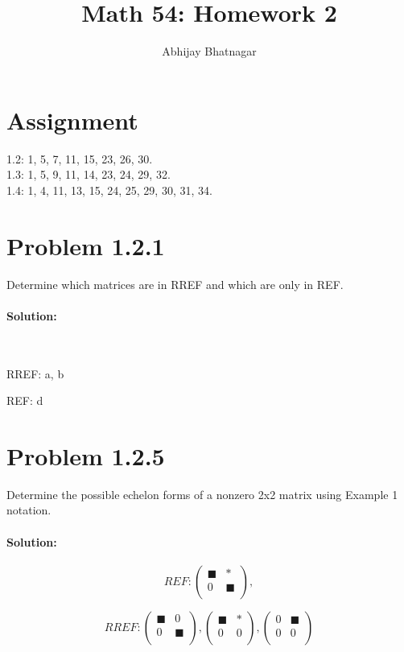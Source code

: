 \documentclass[11pt, notitlepage]{report}
\makeatletter
\newenvironment{solution}{\paragraph{Solution:}}{\hfill}
\newcommand*{\toccontents}{\@starttoc{toc}}
\makeatother
\begin{document}
   \title{Math 54: Homework 2}
   \author{Abhijay Bhatnagar}
   \maketitle

   \toccontents



\setcounter{secnumdepth}{0} %
\section{Assignment}

1.2: 1, 5, 7, 11, 15, 23, 26, 30.\\
1.3: 1, 5, 9, 11, 14, 23, 24, 29, 32.\\
1.4: 1, 4, 11, 13, 15, 24, 25, 29, 30, 31, 34.	

\newpage
\section{Problem 1.2.1}

Determine which matrices are in RREF and which are only in REF.

\begin{solution} \

RREF: a, b

REF: d
\end{solution}

\section{Problem 1.2.5}

Determine the possible echelon forms of a nonzero 2x2 matrix using Example 1 notation.

\begin{solution}
 
 \[REF:\left(\begin{matrix}{}
  \blacksquare 	& * 				\\
  0				& \blacksquare 	\\
\end{matrix}\right),
%
\]
 
 \[RREF:\left(\begin{matrix}{}
  \blacksquare 	& 0 				\\
  0				& \blacksquare 	\\
\end{matrix}\right),
%
\left(\begin{matrix}{}
  \blacksquare 	& * 				\\
  0				& 0 				\\
\end{matrix}\right),
%
\left(\begin{matrix}{}
  0				& \blacksquare 	\\
  0				& 0 				\\
\end{matrix}\right)\]
 
\end{solution}
\end{document}
